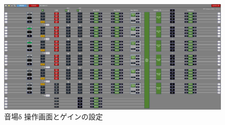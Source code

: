 \documentclass[11pt,a4j]{jreport}
\begin{document}
\newpage

\begin{figure}[H]
  \centering
  \includegraphics[width=.9\linewidth]{images/experimentField/afcParameters/04delta/01overall.jpg}
  \caption{音場δ 操作画面とゲインの設定}
  \label{fig:delta操作画面}
\end{figure}
\end{document}
